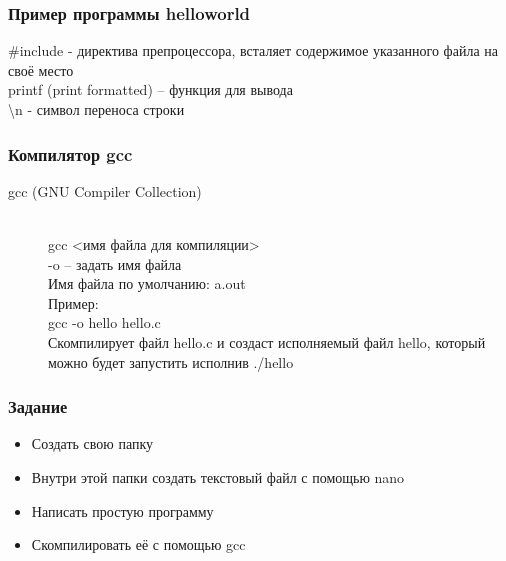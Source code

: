 \documentclass[14pt,pdf,hyperref={unicode}]{beamer}
\begin{document}
\begin{frame}
\frametitle{Пример программы helloworld}



\#include - директива препроцессора, всталяет содержимое указанного файла на своё место \\
printf (print formatted) -- функция для вывода \\
\textbackslash n - символ переноса строки

\end{frame}


\begin{frame}
\frametitle{Компилятор gcc}
\begin{description}
  \item[gcc (GNU Compiler Collection)] \hfill \\
  gcc <имя файла для компиляции>\\
  -o -- задать имя файла \\
  Имя файла по умолчанию: a.out \\
  Пример: \\
  \quad  gcc -o hello hello.c \\
  Скомпилирует файл hello.c и создаст исполняемый файл hello, который можно будет запустить исполнив ./hello
\end{description}
\end{frame}


\begin{frame}
\frametitle{Задание} 
\begin{center}
\begin{itemize}
\item Создать свою папку \\
\item Внутри этой папки создать текстовый файл с помощью nano\\
\item Написать простую программу \\
\item Скомпилировать её с помощью gcc
\end{itemize}
\end{center}
\end{frame}
\end{document}
